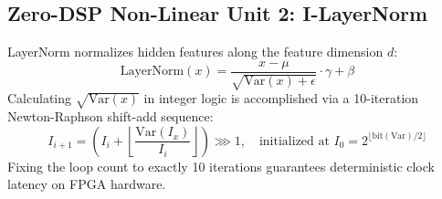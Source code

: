 \documentclass[11pt,a4paper]{article}
\begin{document}
\subsection{Zero-DSP Non-Linear Unit 2: I-LayerNorm}
LayerNorm normalizes hidden features along the feature dimension $d$:
\begin{equation}
\text{LayerNorm}(x) = \frac{x - \mu}{\sqrt{\text{Var}(x) + \epsilon}} \cdot \gamma + \beta
\end{equation}
Calculating $\sqrt{\text{Var}(x)}$ in integer logic is accomplished via a 10-iteration Newton-Raphson shift-add sequence:
\begin{equation}
I_{i+1} = \left( I_i + \left\lfloor \frac{\text{Var}(I_x)}{I_i} \right\rfloor \right) \ggg 1, \quad \text{initialized at } I_0 = 2^{\lfloor \text{bit}(\text{Var})/2 \rfloor}
\end{equation}
Fixing the loop count to exactly 10 iterations guarantees deterministic clock latency on FPGA hardware.
\end{document}
